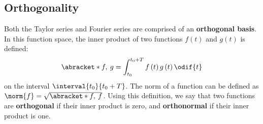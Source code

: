 \documentclass{article}
\begin{document}
\subsection{Orthogonality}
Both the Taylor series and Fourier series are comprised of an
\textbf{orthogonal basis}. In this function space, the inner product of
two functions \(f\left( t \right)\) and \(g\left( t \right)\) is
defined:
\begin{equation*}
    \abracket*{f,\: g} = \int_{t_0}^{t_0 + T} f\left( t \right) g\left( t \right) \odif{t}
\end{equation*}
on the interval \(\interval{t_0}{t_0 + T}\). The norm of a function can
be defined as \(\norm{f} = \sqrt{\abracket*{f,\: f}}\). Using this
definition, we say that two functions are \textbf{orthogonal} if their
inner product is zero, and \textbf{orthonormal} if their inner product
is one.
\end{document}
